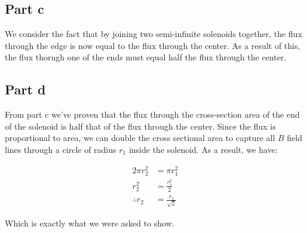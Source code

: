 \documentclass{article}
\theoremstyle{definition}
\numberwithin{equation}{section}
\numberwithin{definition}{section}
\begin{document}
\subsection{Part c}

We consider the fact that by joining two semi-infinite solenoids together, the flux through the edge is now equal to the flux through the center. As a result of this, the flux thorugh one of the ends must equal half the flux through the center.

\subsection{Part d}


From part c we've proven that the flux through the cross-section area of the end of the solenoid is half that of the flux through the center. Since the flux is proportional to area, we can double the cross sectional area to capture all $B$ field lines through a circle of radius $r_1$ inside the solenoid. As a result, we have:

\begin{align*}
  2 \pi r_2^2 &= \pi r_1^2\\
  r_2^2 &= \frac{r_1^2}{2}\\
  \therefore r_2 &= \frac{r_1}{\sqrt 2}
\end{align*}

Which is exactly what we were asked to show. 
\end{document}
